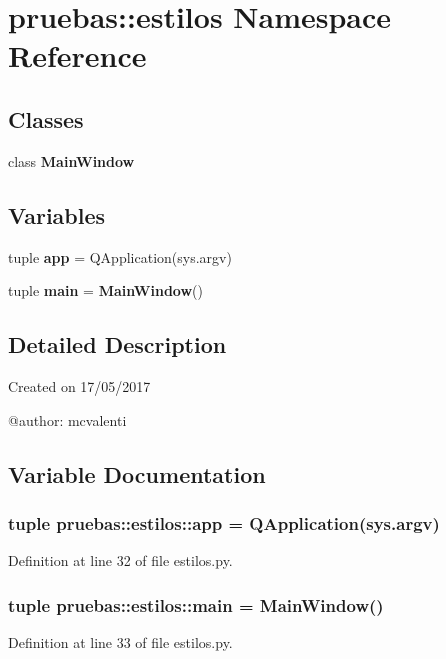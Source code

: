 \section{pruebas\-:\-:estilos \-Namespace \-Reference}
\label{namespacepruebas_1_1estilos}
\subsection*{\-Classes}
\begin{DoxyCompactItemize}
\item 
class {\bf \-Main\-Window}
\end{DoxyCompactItemize}
\subsection*{\-Variables}
\begin{DoxyCompactItemize}
\item 
tuple {\bf app} = \-Q\-Application(sys.\-argv)
\item 
tuple {\bf main} = {\bf \-Main\-Window}()
\end{DoxyCompactItemize}


\subsection{\-Detailed \-Description}
\begin{DoxyVerb}
Created on 17/05/2017

@author: mcvalenti
\end{DoxyVerb}
 

\subsection{\-Variable \-Documentation}
\subsubsection[{app}]{\setlength{\rightskip}{0pt plus 5cm}tuple {\bf pruebas\-::estilos\-::app} = \-Q\-Application(sys.\-argv)}\label{namespacepruebas_1_1estilos_abc85a274e205a645bee622db6350ec2e}


\-Definition at line 32 of file estilos.\-py.

\subsubsection[{main}]{\setlength{\rightskip}{0pt plus 5cm}tuple {\bf pruebas\-::estilos\-::main} = {\bf \-Main\-Window}()}\label{namespacepruebas_1_1estilos_a7270c3c018f7e8cc6f26bc34f7008093}


\-Definition at line 33 of file estilos.\-py.

